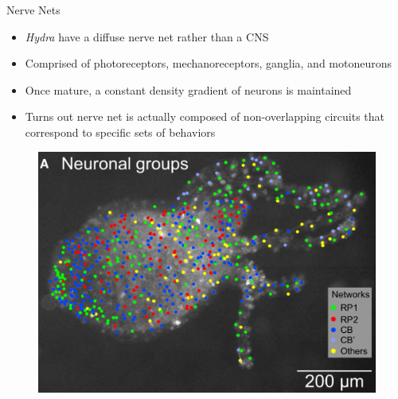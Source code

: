 \documentclass[leqno,presentation,unknownkeysallowed]{beamer}
\begin{document}
\begin{frame}{Nerve Nets}
\begin{itemize}
\item \textit{Hydra} have a diffuse nerve net rather than a CNS
\item Comprised of photoreceptors, mechanoreceptors, ganglia, and motoneurons
\item Once mature, a constant density gradient of neurons is maintained
\item Turns out nerve net is actually composed of non-overlapping circuits that correspond to specific sets of behaviors
\end{itemize}
\begin{figure}
\centering
\includegraphics[scale=0.25]{hydra_map.png}
\end{figure}
\end{frame}
\end{document}
